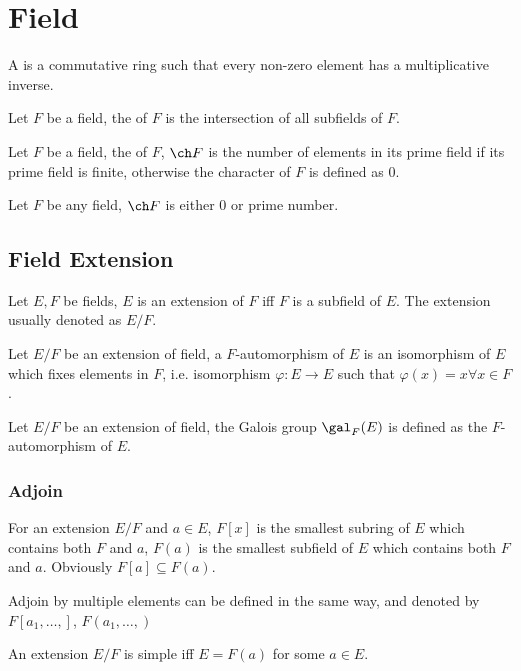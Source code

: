 \section{Field}

\begin{defi}[field]
A  is a commutative ring such that every non-zero element has a multiplicative inverse.
\end{defi}

\begin{defi}
Let $F$ be a field, the  of $F$ is the intersection of all subfields of $F$.
\end{defi}

\begin{defi}
Let $F$ be a field, the  of $F$, $\ch F$ is the number of elements in its prime field
if its prime field is finite, otherwise the character of $F$ is defined as $0$.
\end{defi}

\begin{pro}
Let $F$ be any field, $\ch F$ is either $0$ or prime number.
\end{pro}

\subsection{Field Extension}
Let $E, F$ be fields, $E$ is an extension of $F$ iff $F$ is a subfield of $E$.
The extension usually denoted as $E/F$.

\begin{defi}
Let $E/F$ be an extension of field, a $F$-automorphism of $E$ is an isomorphism
of $E$ which fixes elements in $F$, i.e.
isomorphism $\varphi : E \to E$ such that $\varphi(x) = x \forall x \in F$.
\end{defi}

\begin{defi}
Let $E/F$ be an extension of field, the Galois group $\gal_F(E)$ is defined as the
$F$-automorphism of $E$.
\end{defi}

\subsubsection{Adjoin}
For an extension $E/F$ and $a \in E$, $F[x]$ is the smallest subring of $E$
which contains both $F$ and $a$, $F(a)$ is the smallest subfield of $E$ which
contains both $F$ and $a$. Obviously $F[a] \subseteq F(a)$.

Adjoin by multiple elements can be defined in the same way, and denoted by
$F[a_1, \dots, ]$, $F(a_1, \dots, )$

\begin{defi}
An extension $E/F$ is simple iff $E = F(a)$ for some $a \in E$.
\end{defi}
